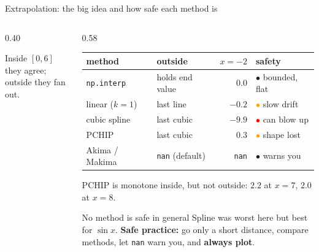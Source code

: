 \documentclass[aspectratio=169]{beamer}
\begin{document}
\begin{frame}{Extrapolation: the big idea and how safe each method is}
\begin{columns}[T]
\begin{column}{0.40\textwidth}

\vspace{-0.3em}\scriptsize Inside $[0,6]$ they agree; outside they fan out.
\end{column}
\begin{column}{0.58\textwidth}
\scriptsize
\setlength{\tabcolsep}{4pt}\renewcommand{\arraystretch}{1.2}
\begin{tabular}{@{}llrl@{}}
\toprule
method & outside & $x{=}-2$ & safety \\ \midrule
\texttt{np.interp} & holds end value & $0.0$ & \textcolor{gr}{$\bullet$} bounded, flat \\
linear ($k{=}1$) & last line & $-0.2$ & \textcolor{orange}{$\bullet$} slow drift \\
cubic spline & last cubic & $-9.9$ & \textcolor{red}{$\bullet$} can blow up \\
PCHIP & last cubic & $0.3$ & \textcolor{orange}{$\bullet$} shape lost \\
Akima / Makima & \texttt{nan} (default) & \texttt{nan} & \textcolor{gr}{$\bullet$} warns you \\
\bottomrule
\end{tabular}

\vspace{0.2em}
\scriptsize PCHIP is monotone inside, but not outside: $2.2$ at $x{=}7$, $2.0$ at $x{=}8$.

\vspace{0.3em}
\begin{alertblock}{No method is safe in general}
\scriptsize
Spline was worst here but best for $\sin x$. \textbf{Safe practice:} go only a short distance, compare methods, let \texttt{nan} warn you, and \textbf{always plot}.
\end{alertblock}
\end{column}
\end{columns}
\end{frame}
\end{document}
